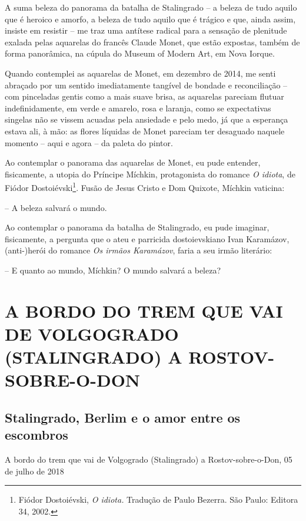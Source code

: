 A suma beleza do panorama da batalha de Stalingrado -- a beleza de tudo
aquilo que é heroico e amorfo, a beleza de tudo aquilo que é trágico e
que, ainda assim, insiste em resistir -- me traz uma antítese radical
para a sensação de plenitude exalada pelas aquarelas do francês Claude
Monet, que estão expostas, também de forma panorâmica, na cúpula do
Museum of Modern Art, em Nova Iorque.

Quando contemplei as aquarelas de Monet, em dezembro de 2014, me senti
abraçado por um sentido imediatamente tangível de bondade e
reconciliação -- com pinceladas gentis como a mais suave brisa, as
aquarelas pareciam flutuar indefinidamente, em verde e amarelo, rosa e
laranja, como se expectativas singelas não se vissem acuadas pela
ansiedade e pelo medo, já que a esperança estava ali, à mão: as flores
líquidas de Monet pareciam ter desaguado naquele momento -- aqui e agora
-- da paleta do pintor.

Ao contemplar o panorama das aquarelas de Monet, eu pude entender,
fisicamente, a utopia do Príncipe Míchkin, protagonista do romance
\emph{O idiota}, de Fiódor Dostoiévski\footnote{Fiódor Dostoiévski,
  \emph{O idiota.} Tradução de Paulo Bezerra. São Paulo: Editora 34,
  2002.}. Fusão de Jesus Cristo e Dom Quixote, Míchkin vaticina:

-- A beleza salvará o mundo.

Ao contemplar o panorama da batalha de Stalingrado, eu pude imaginar,
fisicamente, a pergunta que o ateu e parricida dostoievskiano Ivan
Karamázov, (anti-)herói do romance \emph{Os irmãos Karamázov}, faria a
seu irmão literário:

-- E quanto ao mundo, Míchkin? O mundo salvará a beleza?

\newpage
{}
\part*{A BORDO DO TREM QUE VAI DE VOLGOGRADO (STALINGRADO) A ROSTOV-SOBRE-O-DON}

\chapter*{Stalingrado, Berlim e o amor entre os escombros}

\begin{flushright}
A bordo do trem que vai de Volgogrado (Stalingrado) a Rostov-sobre-o-Don,
05 de julho de 2018
\end{flushright}

